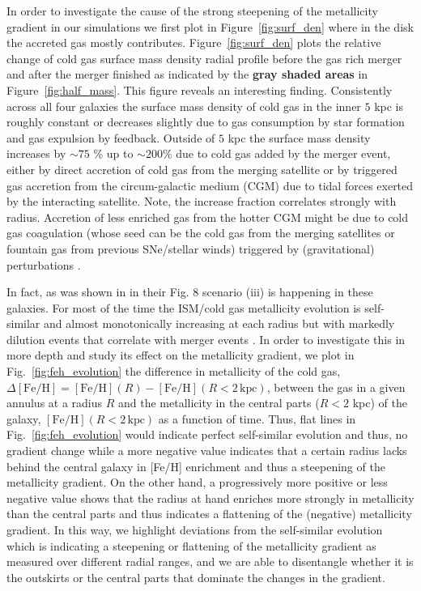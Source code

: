 \documentclass[useAMS,usenatbib]{mnras}
\begin{document}
In order to investigate the cause of the strong steepening of the metallicity gradient in our simulations we first plot in Figure~\ref{fig:surf_den} where in the disk the accreted gas mostly contributes. Figure~\ref{fig:surf_den} plots the relative change of cold gas surface mass density radial profile before the gas rich merger and after the merger finished as indicated by the \textbf{gray shaded areas} in Figure~\ref{fig:half_mass}. This figure reveals an interesting finding. Consistently across all four galaxies the surface mass density of cold gas in the inner $5$ kpc is roughly constant or decreases slightly due to gas consumption by star formation and gas expulsion by feedback. Outside of $5$ kpc the surface mass density increases by $\sim75$ \% up to $\sim200$\% due to cold gas added by the merger event, either by direct accretion of cold gas from the merging satellite or by triggered gas accretion from the circum-galactic medium (CGM) due to tidal forces exerted by the interacting satellite. Note, the increase fraction correlates strongly with radius. Accretion of less enriched gas from the hotter CGM might be due to cold gas coagulation (whose seed can be the cold gas from the merging satellites or fountain gas \citep[e.g.][]{Armillotta2016,Sparre2020} from previous SNe/stellar winds) triggered by (gravitational) perturbations \citep[e.g.][]{Gronke2022}.

In fact, as was shown in \citet{Buck2020} in their Fig. 8 scenario (iii) is happening in these galaxies. For most of the time the ISM/cold gas metallicity evolution is self-similar and almost monotonically increasing at each radius but with markedly dilution events that correlate with merger events \citep[see also][]{Sparre2022}. In order to investigate this in more depth and study its effect on the metallicity gradient, we plot in Fig.~\ref{fig:feh_evolution} the difference in metallicity of the cold gas, $\Delta\mathrm{[Fe/H]}=\mathrm{[Fe/H]}(R)-\mathrm{[Fe/H]}(R<2\, \mathrm{kpc})$, between the gas in a given annulus at a radius $R$ and the metallicity in the central parts ($R<2$ kpc) of the galaxy, $\mathrm{[Fe/H]}(R<2\, \mathrm{kpc})$ as a function of time. Thus, flat lines in Fig.~\ref{fig:feh_evolution} would indicate perfect self-similar evolution and thus, no gradient change while a more negative value indicates that a certain radius lacks behind the central galaxy in [Fe/H] enrichment and thus a steepening of the metallicity gradient. On the other hand, a progressively more positive or less negative value shows that the radius at hand enriches more strongly in metallicity than the central parts and thus indicates a flattening of the (negative) metallicity gradient. In this way, we highlight deviations from the self-similar evolution which is indicating a steepening or flattening of the metallicity gradient as measured over different radial ranges, and we are able to disentangle whether it is the outskirts or the central parts that dominate the changes in the gradient. 
\end{document}
